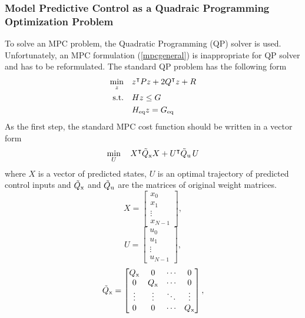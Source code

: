 \subsubsection{Model Predictive Control as a Quadraic Programming Optimization Problem}
To solve an MPC problem, the Quadratic Programming (QP) solver is used. Unfortunately, an MPC formulation (\ref{mpcgeneral}) is inappropriate for QP solver and has to be reformulated. The standard QP problem has the following form
\begin{subequations}
	\begin{align}
	\min_{z}\quad & z^\intercal Pz + 2Q^\intercal z + R\\
	\label{cst_qp}\text{s.t.}\quad&Hz\leq G\\
	&H _{\text{eq}}z = G _{\text{eq}}
	\end{align}
\end{subequations}
As the first step, the standard MPC cost function should be written in a vector form
\begin{equation}
	\min_{U}\quad X^\intercal\tilde{Q} _{\text{x}}X + U^\intercal\tilde{Q} _{\text{u}}\,U\\
\end{equation}
where $X$ is a vector of predicted states, $U$ is an optimal trajectory of predicted control inputs and $\tilde{Q} _{\text{x}}$ and $\tilde{Q} _{\text{u}}$ are the matrices of original weight matrices.
\begin{equation}
	X = \begin{bmatrix}
	x_0\\x_{1}\\\vdots\\x_{N-1}
		\end{bmatrix},
\end{equation}
\begin{equation}
U = \begin{bmatrix}
u_0\\u_{1}\\\vdots\\u_{N-1}
\end{bmatrix},
\end{equation}
\begin{equation}
\tilde{Q} _{\text{x}} = \begin{bmatrix}
Q _{\text{x}}&0&\cdots&0\\
0&Q _{\text{x}}&\cdots&0\\
\vdots&\vdots&\ddots&\vdots\\
0&0&\cdots&Q _{\text{x}}
\end{bmatrix},
\end{equation}
